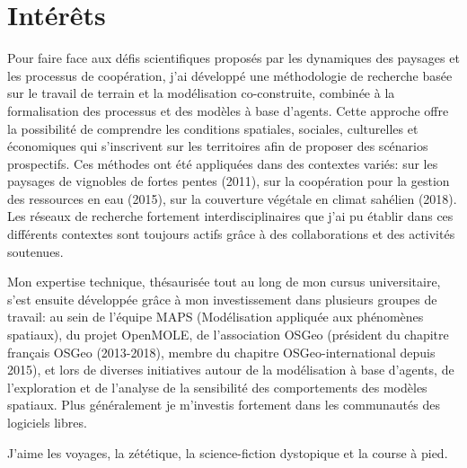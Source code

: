 \documentclass[]{cv-etienne}
\begin{document}
\section{Intérêts}
Pour faire face aux défis scientifiques proposés par les dynamiques des paysages et les processus de coopération, j'ai développé une méthodologie de recherche basée sur le travail de terrain et la modélisation co-construite, combinée à la formalisation des processus et des modèles à base d'agents.
Cette approche offre la possibilité de comprendre les conditions spatiales, sociales, culturelles et économiques qui s'inscrivent sur les territoires afin de proposer des scénarios prospectifs.
Ces méthodes ont été appliquées dans des contextes variés: sur les paysages de vignobles de fortes pentes (2011), sur la coopération pour la gestion des ressources en eau (2015), sur la couverture végétale en climat sahélien (2018).
Les réseaux de recherche fortement interdisciplinaires que j'ai pu établir dans ces différents contextes sont toujours actifs grâce à des collaborations et des activités soutenues.

Mon expertise technique, thésaurisée tout au long de mon cursus universitaire, s'est ensuite développée grâce à mon investissement dans plusieurs groupes de travail: au sein de l'équipe MAPS (Modélisation appliquée aux phénomènes spatiaux), du projet OpenMOLE, de l'association OSGeo (président du chapitre français OSGeo (2013-2018), membre du chapitre OSGeo-international depuis 2015), et lors de diverses initiatives autour de la modélisation à base d'agents, de l'exploration et de l'analyse de la sensibilité des comportements des modèles spatiaux. Plus généralement je m'investis fortement dans les communautés des logiciels libres.

J'aime les voyages, la zététique, la science-fiction dystopique et la course à pied.
\end{document}
